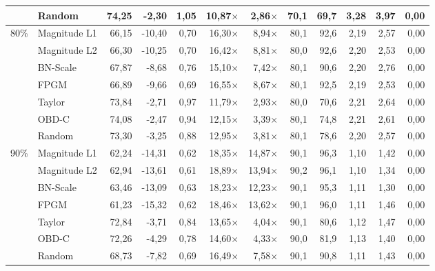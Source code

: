 \begin{table}[H]
{{\begin{tabular}{c l rr rrr rr rrr}
     & Random & 74,25 & -2,30 & 1,05 & 10,87$\times$ & 2,86$\times$ & 70,1 & 69,7 & 3,28 & 3,97 & 0,00 \\
    \midrule
    \multirow{7}{*}{80\%} & Magnitude L1 & 66,15 & -10,40 & 0,70 & 16,30$\times$ & 8,94$\times$ & 80,1 & 92,6 & 2,19 & 2,57 & 0,00 \\
     & Magnitude L2 & 66,30 & -10,25 & 0,70 & 16,42$\times$ & 8,81$\times$ & 80,0 & 92,6 & 2,20 & 2,53 & 0,00 \\
     & BN-Scale & 67,87 & -8,68 & 0,76 & 15,10$\times$ & 7,42$\times$ & 80,1 & 90,6 & 2,20 & 2,76 & 0,00 \\
     & FPGM & 66,89 & -9,66 & 0,69 & 16,55$\times$ & 8,67$\times$ & 80,1 & 92,5 & 2,19 & 2,53 & 0,00 \\
     & Taylor & 73,84 & -2,71 & 0,97 & 11,79$\times$ & 2,93$\times$ & 80,0 & 70,6 & 2,21 & 2,64 & 0,00 \\
     & OBD-C & 74,08 & -2,47 & 0,94 & 12,15$\times$ & 3,39$\times$ & 80,1 & 74,8 & 2,21 & 2,61 & 0,00 \\
     & Random & 73,30 & -3,25 & 0,88 & 12,95$\times$ & 3,81$\times$ & 80,1 & 78,6 & 2,20 & 2,57 & 0,00 \\
    \midrule
    \multirow{7}{*}{90\%} & Magnitude L1 & 62,24 & -14,31 & 0,62 & 18,35$\times$ & 14,87$\times$ & 90,1 & 96,3 & 1,10 & 1,42 & 0,00 \\
     & Magnitude L2 & 62,94 & -13,61 & 0,61 & 18,89$\times$ & 13,94$\times$ & 90,2 & 96,1 & 1,10 & 1,34 & 0,00 \\
     & BN-Scale & 63,46 & -13,09 & 0,63 & 18,23$\times$ & 12,23$\times$ & 90,1 & 95,3 & 1,11 & 1,30 & 0,00 \\
     & FPGM & 61,23 & -15,32 & 0,62 & 18,46$\times$ & 13,62$\times$ & 90,1 & 96,0 & 1,11 & 1,46 & 0,00 \\
     & Taylor & 72,84 & -3,71 & 0,84 & 13,65$\times$ & 4,04$\times$ & 90,1 & 80,6 & 1,12 & 1,47 & 0,00 \\
     & OBD-C & 72,26 & -4,29 & 0,78 & 14,60$\times$ & 4,33$\times$ & 90,0 & 81,9 & 1,13 & 1,40 & 0,00 \\
     & Random & 68,73 & -7,82 & 0,69 & 16,49$\times$ & 7,58$\times$ & 90,1 & 90,8 & 1,11 & 1,43 & 0,00 \\
    \bottomrule
  \end{tabular}}}
\end{table}
